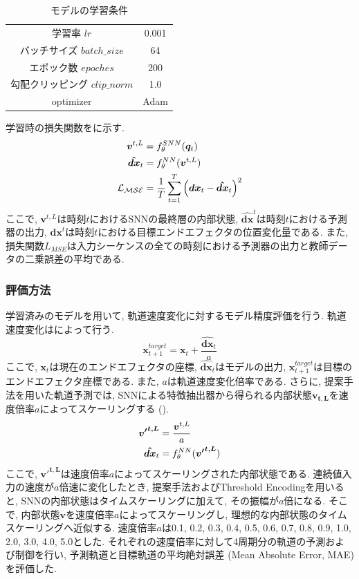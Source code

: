 \begin{table}[htb]
    \centering
    \caption{モデルの学習条件}
    \label{tab:exp3:train:parameter}
    \begin{tabular}{cc}
        \hline
        学習率 $lr$ & 0.001\\
        バッチサイズ $batch\_size$ & 64\\
        エポック数 $epoches$ & 200\\
        勾配クリッピング $clip\_norm$ & 1.0\\
        optimizer & Adam\\
        \hline
    \end{tabular}
\end{table}

学習時の損失関数をに示す.
\begin{align}
    \bm{v}^{t,L} &= f_{\theta}^{SNN}(\bm{q}_{t}) \notag \\
    \bm{\hat{dx}}_{t} &= f_{\theta}^{NN}(\bm{v}^{t,L}) \notag \\
    \mathcal{L_{MSE}} &= \frac{1}{T} \sum_{t=1}^{T} \left( \bm{dx}_{t} - \bm{\hat{dx}}_{t} \right)^2 \label{eq:exp3:loss}
\end{align}
ここで, $\bm{v}^{t,L}$は時刻$t$におけるSNNの最終層の内部状態, $\bm{\hat{dx}}^{t}$は時刻$t$における予測器の出力, $\bm{dx}^{t}$は時刻$t$における目標エンドエフェクタの位置変化量である.
また, 損失関数$L_{MSE}$は入力シーケンスの全ての時刻における予測器の出力と教師データの二乗誤差の平均である.


\subsubsection{評価方法}
学習済みのモデルを用いて, 軌道速度変化に対するモデル精度評価を行う.
軌道速度変化はによって行う.
\begin{equation}
    \bm{x}_{t+1}^{target} = \bm{x}_{t} + \frac{\bm{\hat{dx}}_{t}} {a} \label{eq:exp3:target_trajectoryx}
\end{equation}
ここで, $\bm{x}_{t}$は現在のエンドエフェクタの座標, $\bm{\hat{dx}}_{t}$はモデルの出力, $\bm{x}_{t+1}^{target}$は目標のエンドエフェクタ座標である.
また, $a$は軌道速度変化倍率である.
さらに, 提案手法を用いた軌道予測では, SNNによる特徴抽出器から得られる内部状態$\bm{v_{t,L}}$を速度倍率$a$によってスケーリングする ().
\begin{align}
    \bm{{v'}^{t,L}} &= \frac{\bm{v}^{t,L}}{a} \notag \\
    \bm{\hat{dx}}_{t} &= f_{\theta}^{NN}(\bm{{v'}^{t,L}}) \label{eq:exp3:fix:volt}
\end{align}
ここで, $\bm{{v'}^{t,L}}$は速度倍率$a$によってスケーリングされた内部状態である.
連続値入力の速度が$a$倍速に変化したとき, 提案手法およびThreshold Encodingを用いると, SNNの内部状態はタイムスケーリングに加えて, その振幅が$a$倍になる.
そこで, 内部状態$\bm{v}$を速度倍率$a$によってスケーリングし, 理想的な内部状態のタイムスケーリングへ近似する.
速度倍率$a$は0.1, 0.2, 0.3, 0.4, 0.5, 0.6, 0.7, 0.8, 0.9, 1.0, 2.0, 3.0, 4.0, 5.0とした.
それぞれの速度倍率に対して4周期分の軌道の予測および制御を行い, 予測軌道と目標軌道の平均絶対誤差 (Mean Absolute Error, MAE) を評価した.


